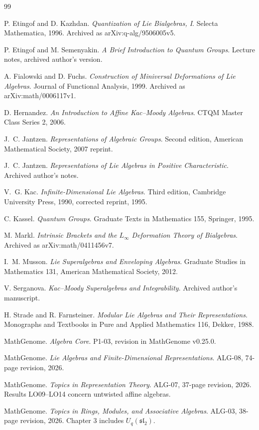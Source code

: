 \begingroup
\footnotesize
\begin{thebibliography}{99}
{}
\renewcommand{\runningchapter}{Bibliography}
\setlength{\itemsep}{2pt}

P. Etingof and D. Kazhdan.
\emph{Quantization of Lie Bialgebras, I}.
Selecta Mathematica, 1996. Archived as arXiv:q-alg/9506005v5.

P. Etingof and M. Semenyakin.
\emph{A Brief Introduction to Quantum Groups}.
Lecture notes, archived author's version.

A. Fialowski and D. Fuchs.
\emph{Construction of Miniversal Deformations of Lie Algebras}.
Journal of Functional Analysis, 1999. Archived as arXiv:math/0006117v1.

D. Hernandez.
\emph{An Introduction to Affine Kac--Moody Algebras}.
CTQM Master Class Series 2, 2006.

J.~C. Jantzen.
\emph{Representations of Algebraic Groups}.
Second edition, American Mathematical Society, 2007 reprint.

J.~C. Jantzen.
\emph{Representations of Lie Algebras in Positive Characteristic}.
Archived author's notes.

V.~G. Kac.
\emph{Infinite-Dimensional Lie Algebras}.
Third edition, Cambridge University Press, 1990, corrected reprint, 1995.

C. Kassel.
\emph{Quantum Groups}.
Graduate Texts in Mathematics 155, Springer, 1995.

M. Markl.
\emph{Intrinsic Brackets and the \(L_\infty\) Deformation Theory of Bialgebras}.
Archived as arXiv:math/0411456v7.

I.~M. Musson.
\emph{Lie Superalgebras and Enveloping Algebras}.
Graduate Studies in Mathematics 131, American Mathematical Society, 2012.

V. Serganova.
\emph{Kac--Moody Superalgebras and Integrability}.
Archived author's manuscript.

H. Strade and R. Farnsteiner.
\emph{Modular Lie Algebras and Their Representations}.
Monographs and Textbooks in Pure and Applied Mathematics 116, Dekker, 1988.

MathGenome.
\emph{Algebra Core}. P1-03, revision in MathGenome v0.25.0.

MathGenome.
\emph{Lie Algebras and Finite-Dimensional Representations}.
ALG-08, 74-page revision, 2026.

MathGenome.
\emph{Topics in Representation Theory}.
ALG-07, 37-page revision, 2026. Results LO09--LO14 concern untwisted affine algebras.

MathGenome.
\emph{Topics in Rings, Modules, and Associative Algebras}.
ALG-03, 38-page revision, 2026. Chapter 3 includes \(U_q(\mathfrak{sl}_2)\).

\end{thebibliography}
\endgroup
